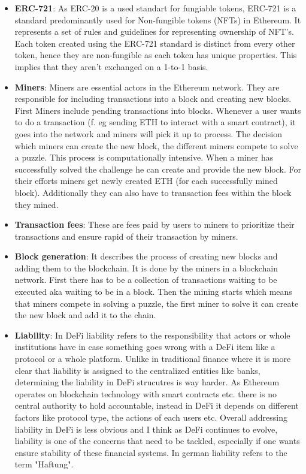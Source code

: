\documentclass{article}
\begin{document}
\begin{itemize}
    \item \textbf{ERC-721}: As ERC-20 is a used standart for fungiable tokens, ERC-721 is a standard predominantly used for Non-fungible tokens (NFTs) in Ethereum. It represents a set of rules and guidelines for representing ownership of NFT's. Each token created using the ERC-721 standard is distinct from every other token, hence they are non-fungible as each token has unique properties. This implies that they aren't exchanged on a 1-to-1 basis.

    \item \textbf{Miners}: Miners are essential actors in the Ethereum network. They are responsible for including transactions into a block and creating new blocks. First Miners include pending transactions into blocks. Whenever a user wants to do a transaction (f. eg sending ETH to interact with a smart contract), it goes into the network and  miners will pick it up to process. The decision which miners can create the new block, the different miners compete to solve a puzzle. This process is computationally intensive. When a miner has successfully solved the challenge he can create and provide the new block. For their efforts miners get newly created ETH (for each successfully mined block). Additionally they can also have to transaction fees within the block they mined.

    \item \textbf{Transaction fees}:
    These are fees paid by users to miners to prioritize their transactions and ensure rapid of their transaction by miners.

    \item \textbf{Block generation}: It describes the process of creating new blocks and adding them to the blockchain. It is done by the miners in a blockchain network. First there has to be a collection of transactions waiting to be executed aka waiting to be in a block. Then the mining starts which means that miners compete in solving a puzzle, the first miner to solve it can create the new block and add it to the chain.

    \item \textbf {Liability}:  In DeFi liability refers to the responsibility that actors or whole institutions have in case something goes wrong with a DeFi item like a protocol or a whole platform. Unlike in traditional finance where it is more clear that liability is assigned to the centralized entities like banks, determining the liability in DeFi strucutres is way harder. As Ethereum operates on blockchain technology with smart contracts etc. there is no central authority to hold accountable, instead in DeFi it depends on different factors like protocol type, the actions of each users etc. Overall addressing liability in DeFi is less obvious and I think as DeFi continues to evolve, liability is one of the concerns that need to be tackled, especially if one wants ensure stability of these financial systems. In german liability refers to the term "Haftung".


\end{itemize}
\end{document}
